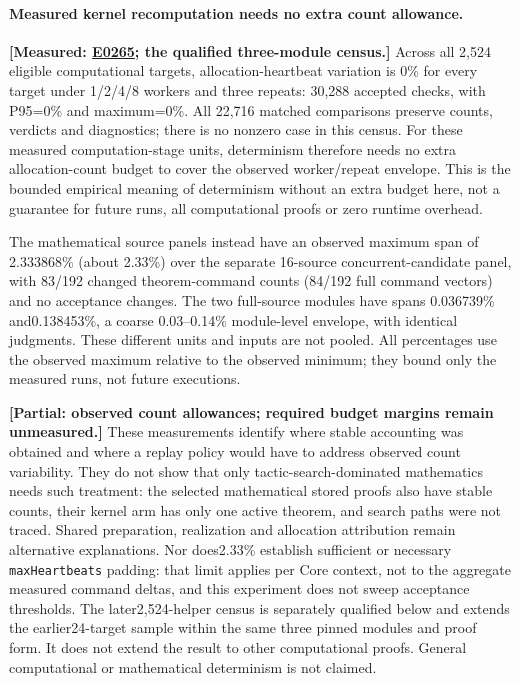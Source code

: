 \documentclass[10pt,twocolumn]{article}
\newcommand{\measured}[1]{\textbf{[Measured: #1]}}
\newcommand{\partialev}[1]{\textbf{[Partial: #1]}}
\newcommand{\expref}[2]{\href{https://github.com/yunwei37/proofserve/blob/main/docs/tmp/build-and-evaluate/step-#1/step-report.md}{E#2}}
\begin{document}
\paragraph{Measured kernel recomputation needs no extra count allowance.}
\measured{\expref{0265-20261102T065555+0000}{0265}; the qualified three-module census.}
Across all 2,524 eligible computational targets, allocation-heartbeat variation
is 0\% for every target under 1/2/4/8 workers and three repeats:
30,288 accepted checks, with P95=0\% and maximum=0\%.
All 22,716 matched comparisons preserve counts, verdicts and diagnostics;
there is no nonzero case in this census.
For these measured computation-stage units, determinism therefore needs
no extra allocation-count budget to cover the observed worker/repeat envelope.
This is the bounded empirical meaning of determinism without an extra budget
here, not a guarantee for future runs, all computational proofs or zero runtime
overhead.

The mathematical source panels instead have an observed maximum span of
2.333868\% (about 2.33\%) over the separate 16-source concurrent-candidate panel,
with 83/192 changed theorem-command counts (84/192 full command vectors)
and no acceptance changes.
The two full-source modules have spans 0.036739\% and0.138453\%,
a coarse 0.03--0.14\% module-level envelope, with identical judgments.
These different units and inputs are not pooled.
All percentages use the observed maximum relative to the observed minimum;
they bound only the measured runs, not future executions.

\partialev{observed count allowances; required budget margins remain unmeasured.}
These measurements identify where stable accounting was obtained and
where a replay policy would have to address observed count variability.
They do not show that only tactic-search-dominated mathematics needs
such treatment: the selected mathematical stored proofs also have stable
counts, their kernel arm has only one active theorem, and search paths
were not traced. Shared preparation, realization and allocation attribution
remain alternative explanations.
Nor does2.33\% establish sufficient or necessary \texttt{maxHeartbeats}
padding: that limit applies per Core context, not to the aggregate measured
command deltas, and this experiment does not sweep acceptance thresholds.
The later2,524-helper census is separately qualified below and extends
the earlier24-target sample within the same three pinned modules and proof
form. It does not extend the result to other computational proofs.
General computational or mathematical determinism is not claimed.
\end{document}
